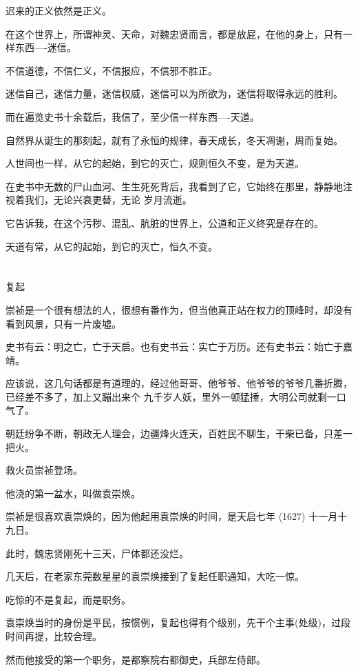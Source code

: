 \documentclass[11pt,a4paper,onecolumn]{article}
\begin{document}
迟来的正义依然是正义。

在这个世界上，所谓神灵、天命，对魏忠贤而言，都是放屁，在他的身上，只有一样东西----迷信。

不信道德，不信仁义，不信报应，不信邪不胜正。

迷信自己，迷信力量，迷信权威，迷信可以为所欲为，迷信将取得永远的胜利。

而在遍览史书十余载后，我信了，至少信一样东西----天道。

自然界从诞生的那刻起，就有了永恒的规律，春天成长，冬天凋谢，周而复始。

人世间也一样，从它的起始，到它的灭亡，规则恒久不变，是为天道。

在史书中无数的尸山血河、生生死死背后，我看到了它，它始终在那里，静静地注视着我们，无论兴衰更替，无论
岁月流逝。

它告诉我，在这个污秽、混乱、肮脏的世界上，公道和正义终究是存在的。

天道有常，从它的起始，到它的灭亡，恒久不变。

\section[\thesection]{}

复起

崇祯是一个很有想法的人，很想有番作为，但当他真正站在权力的顶峰时，却没有看到风景，只有一片废墟。

史书有云：明之亡，亡于天启。也有史书云：实亡于万历。还有史书云：始亡于嘉靖。

应该说，这几句话都是有道理的，经过他哥哥、他爷爷、他爷爷的爷爷几番折腾，已经差不多了，加上又蹦出来个
九千岁人妖，里外一顿猛捶，大明公司就剩一口气了。

朝廷纷争不断，朝政无人理会，边疆烽火连天，百姓民不聊生，干柴已备，只差一把火。

救火员崇祯登场。

他浇的第一盆水，叫做袁崇焕。

崇祯是很喜欢袁崇焕的，因为他起用袁崇焕的时间，是天启七年 (1627) 十一月十九日。

此时，魏忠贤刚死十三天，尸体都还没烂。

几天后，在老家东莞数星星的袁崇焕接到了复起任职通知，大吃一惊。

吃惊的不是复起，而是职务。

袁崇焕当时的身份是平民，按惯例，复起也得有个级别，先干个主事(处级)，过段时间再提，比较合理。

然而他接受的第一个职务，是都察院右都御史，兵部左侍郎。
\end{document}

